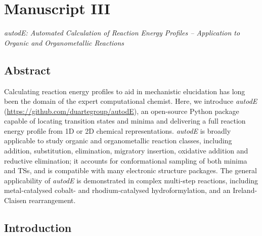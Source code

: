 \documentclass[../../main.tex]{subfiles}
\begin{document}
\setcounter{footnote}{0} 

\newcommand{\ade}{\emph{autodE }}
\newcommand{\lmethod}{\emph{lmethod}}
\newcommand{\hmethod}{\emph{hmethod}}
\newcommand{\lmethodx}{\emph{lmethod }}
\newcommand{\hmethodx}{\emph{hmethod }}



\section{Manuscript III}

\emph{autodE: Automated Calculation of Reaction Energy Profiles -- Application to Organic and Organometallic Reactions}


\subsection{Abstract}

Calculating reaction energy profiles to aid in mechanistic elucidation has long been the domain of the expert computational chemist. Here, we introduce \ade (\url{https://github.com/duartegroup/autodE}), an open-source Python package capable of locating transition states and minima and delivering a full reaction energy profile from 1D or 2D chemical representations. \ade is broadly applicable to study organic and organometallic reaction classes, including addition, substitution, elimination, migratory insertion, oxidative addition and reductive elimination; it accounts for conformational sampling of both minima and TSs, and is compatible with many electronic structure packages. The general applicability of \ade is demonstrated in complex multi-step reactions, including metal-catalysed cobalt- and rhodium-catalysed hydroformylation, and an Ireland-Claisen rearrangement.


\subsection{Introduction}
\end{document}
